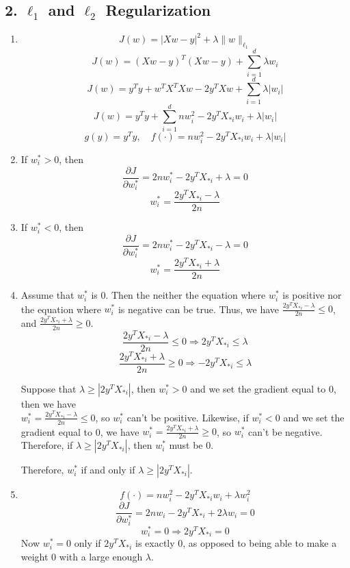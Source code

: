\documentclass{article}
\begin{document}
\newpage


\subsection*{2. $\ell_1$ and $\ell_2$ Regularization}
\begin{enumerate}[label=\arabic*)]
\item
$$J(w)=|Xw-y|^2+\lambda \lVert w \rVert_{\ell_1}$$
$$J(w)=(Xw-y)^T(Xw-y)+\sum_{i=1}^d \lambda w_i$$
$$J(w)=y^Ty+w^TX^TXw - 2y^TXw + \sum_{i=1}^d \lambda |w_i|$$
$$J(w)=y^Ty+\sum_{i=1}^d nw_i^2-2y^TX_{*i}w_i+\lambda |w_i|$$
$$g(y) = y^Ty, \quad f(\cdot) = nw_i^2-2y^TX_{*i}w_i+\lambda |w_i|$$
\item If $w^*_i>0$, then
$$\frac{\partial J}{\partial w^*_i}=2nw^*_i-2y^TX_{*i}+\lambda=0$$
$$w^*_i=\frac{2y^TX_{*i}-\lambda}{2n}$$
\item If $w^*_i<0$, then
$$\frac{\partial J}{\partial w^*_i}=2nw^*_i-2y^TX_{*i}-\lambda=0$$
$$w^*_i=\frac{2y^TX_{*i}+\lambda}{2n}$$
\item
Assume that $w^*_i$ is 0. Then the neither the equation where $w^*_i$ is positive nor the equation where $w^*_i$ is negative can be true. Thus, we have $\frac{2y^TX_{*i}-\lambda}{2n} \leq 0$, and $\frac{2y^TX_{*i}+\lambda}{2n} \geq 0$.
$$\frac{2y^TX_{*i}-\lambda}{2n} \leq 0 \Rightarrow 2y^TX_{*i} \leq \lambda$$
$$\frac{2y^TX_{*i}+\lambda}{2n} \geq 0 \Rightarrow -2y^TX_{*i} \leq \lambda$$

Suppose that $\lambda \geq |2y^TX_{*i}|$, then $w^*_i>0$ and we set the gradient equal to 0, then we have\\ $w^*_i=\frac{2y^TX_{*i}-\lambda}{2n} \leq 0$, so $w^*_i$ can't be positive. Likewise, if $w^*_i < 0$ and we set the gradient equal to 0, we have $w^*_i=\frac{2y^TX_{*i}+\lambda}{2n} \geq 0$, so $w^*_i$ can't be negative. Therefore, if $\lambda \geq |2y^TX_{*i}|$, then $w^*_i$ must be 0.

Therefore, $w^*_i$ if and only if $\lambda \geq |2y^TX_{*i}|$.

\item $$f(\cdot)=nw_i^2-2y^TX_{*i}w_i+\lambda w_i^2$$
$$\frac{\partial J}{\partial w^*_i} = 2nw_i - 2y^TX_{*i} + 2\lambda w_i=0$$
$$w^*_i=0 \Rightarrow 2y^TX_{*i}=0$$
Now $w^*_i=0$ only if $2y^TX_{*i}$ is exactly 0, as opposed to being able to make a weight 0 with a large enough $\lambda$.
\end{enumerate}


\newpage
\end{document}
